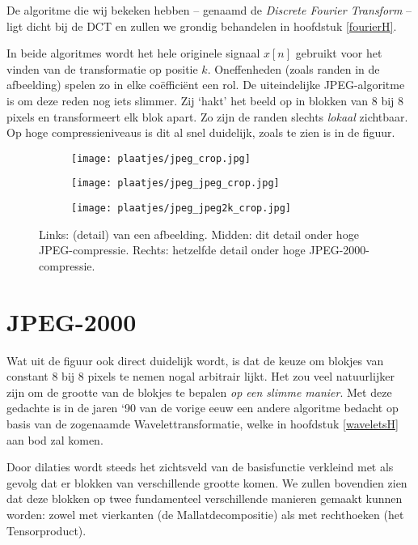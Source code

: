\documentclass[11pt]{uvamath}
\theoremstyle{plain}
\theoremstyle{definition}
\theoremstyle{remark}
\begin{document}
De algoritme die wij bekeken hebben -- genaamd de \emph{Discrete Fourier Transform} -- ligt dicht bij de DCT en zullen we grondig behandelen in hoofdstuk \ref{fourierH}.

In beide algoritmes wordt het hele originele signaal $x[n]$ gebruikt voor het vinden van de transformatie op positie $k$. Oneffenheden (zoals randen in de afbeelding) spelen zo in elke co\"effici\"ent een rol. De uiteindelijke JPEG-algoritme is om deze reden nog iets slimmer. Zij `hakt' het beeld op in blokken van 8 bij 8 pixels en transformeert elk blok apart. Zo zijn de randen slechts \emph{lokaal} zichtbaar. Op hoge compressieniveaus is dit al snel duidelijk, zoals te zien is in de figuur.
\begin{figure*}[h]
\label{duidelijk}
	\centering
	\begin{subfigure}{0.32\linewidth}
		\texttt{[image: plaatjes/jpeg\_crop.jpg]}
	\end{subfigure}
	\begin{subfigure}{0.32\linewidth}
		\texttt{[image: plaatjes/jpeg\_jpeg\_crop.jpg]}
	\end{subfigure}
	\begin{subfigure}{0.32\linewidth}
		\texttt{[image: plaatjes/jpeg\_jpeg2k\_crop.jpg]}
	\end{subfigure}
	\caption*{Links: (detail) van een afbeelding. Midden: dit detail onder hoge JPEG-compressie. Rechts: hetzelfde detail onder hoge JPEG-2000-compressie.}
\end{figure*}

\section*{JPEG-2000}
Wat uit de figuur ook direct duidelijk wordt, is dat de keuze om blokjes van constant 8 bij 8 pixels te nemen nogal arbitrair lijkt. Het zou veel natuurlijker zijn om de grootte van de blokjes te bepalen \emph{op een slimme manier}. Met deze gedachte is in de jaren `90 van de vorige eeuw een andere algoritme bedacht op basis van de zogenaamde Wavelettransformatie, welke in hoofdstuk \ref{waveletsH} aan bod zal komen. 

Door dilaties wordt steeds het zichtsveld van de basisfunctie verkleind met als gevolg dat er blokken van verschillende grootte komen. We zullen bovendien zien dat deze blokken op twee fundamenteel verschillende manieren gemaakt kunnen worden: zowel met vierkanten (de Mallatdecompositie) als met rechthoeken (het Tensorproduct).
\end{document}
